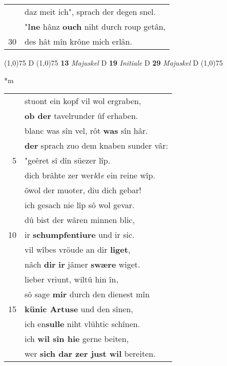 \documentclass[8pt,a4paper,notitlepage]{article}
\begin{document}
\begin{table}[ht]
\begin{minipage}[t]{0.5\linewidth}
\begin{tabular}{rl}
 & daz meit ich", sprach der degen snel.\\ 
 & "I\textbf{ne} hânz \textbf{ouch} niht durch roup getân,\\ 
30 & des hât mîn krône mich erlân.\\ 
\end{tabular}
\scriptsize
\line(1,0){75} \newline
D \newline
\line(1,0){75} \newline
\textbf{13} \textit{Majuskel} D  \textbf{19} \textit{Initiale} D  \textbf{29} \textit{Majuskel} D  \newline
\line(1,0){75} \newline
\newline
\end{minipage}
\hspace{0.5cm}
\begin{minipage}[t]{0.5\linewidth}
\small
\begin{center}*m
\end{center}
\begin{tabular}{rl}
 & stuont ein kopf vil wol ergraben,\\ 
 & \textbf{ob der} tavelrunder ûf erhaben.\\ 
 & blanc was sîn vel, rôt \textbf{was} sîn hâr.\\ 
 & \textbf{der} sprach zuo dem knaben sunder vâr:\\ 
5 & "geêret sî dîn süezer lîp.\\ 
 & dich brâhte zer wer\textit{l}d\textit{e} ein reine wîp.\\ 
 & ôwol der muoter, diu dich gebar!\\ 
 & ich gesach nie lîp sô wol gevar.\\ 
 & dû bist der wâren minnen blic,\\ 
10 & ir \textbf{schumpfentiure} und ir sic.\\ 
 & vil wîbes vröude an dir \textbf{liget},\\ 
 & nâch \textbf{dir} \textbf{ir} jâmer \textbf{swære} wiget.\\ 
 & lieber vriunt, wiltû hin în,\\ 
 & sô sage \textbf{mir} durch den dienest mîn\\ 
15 & \textbf{künic Artuse} und den sînen,\\ 
 & ich en\textbf{sulle} niht vlühtic schînen.\\ 
 & ich \textbf{wil sîn hie} gerne beiten,\\ 
 & wer \textbf{sich dar zer just wil} bereiten.\\ 

\end{tabular}
\end{minipage}
\end{table}
\end{document}
